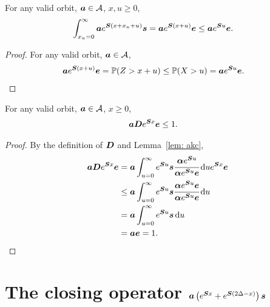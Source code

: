 \begin{lem}\label{lem: akc}
For any valid orbit, \(\boldsymbol a\in\mathcal A\), \(x,u\geq 0\), 
        \begin{align*}
        		\int_{x_n=0}^\infty \boldsymbol a e^{\boldsymbol{S}(x+x_n+u)}\boldsymbol s = \boldsymbol a e^{\boldsymbol{S}(x+u)}\boldsymbol e &\leq \boldsymbol a e^{\boldsymbol{S}u}\boldsymbol e. 
	\end{align*}
\end{lem}
\begin{proof}
	For any valid orbit, \(\boldsymbol a\in\mathcal A\), 
        \begin{align*}
        		\boldsymbol a e^{\boldsymbol{S}(x+u)}\boldsymbol e &= \mathbb P(Z>x+u) \leq\mathbb P(X>u) = \boldsymbol a e^{\boldsymbol Su} \boldsymbol e. 
	\end{align*}
\end{proof}
\begin{lem}\label{lem:macmnm}
	For any valid orbit, \(\boldsymbol a\in\mathcal A\), \(x\geq 0\), 
        \begin{align*}
        		\boldsymbol a\boldsymbol D e^{\boldsymbol{S}x}\boldsymbol e &\leq 1. 
	\end{align*}
\end{lem}
\begin{proof}
By the definition of \(\boldsymbol D\) and Lemma~\ref{lem: akc},
	\begin{align*}
        		\boldsymbol a\boldsymbol D e^{\boldsymbol{S}x}\boldsymbol e &= \boldsymbol a \int_{u=0}^\infty e^{\boldsymbol Su}\boldsymbol s\cfrac{\boldsymbol \alpha e^{\boldsymbol Su}}{\boldsymbol \alpha e^{\boldsymbol Su}\boldsymbol e}\, \mathrm{d} ue^{\boldsymbol{S}x}\boldsymbol e
		\\& \leq \boldsymbol a \int_{u=0}^\infty e^{\boldsymbol Su}\boldsymbol s\cfrac{\boldsymbol \alpha e^{\boldsymbol Su}\boldsymbol e}{\boldsymbol \alpha e^{\boldsymbol Su}\boldsymbol e}\, \mathrm{d} u
		\\& = \boldsymbol a \int_{u=0}^\infty e^{\boldsymbol Su}\boldsymbol s\, \mathrm{d} u
		\\& = \boldsymbol a \boldsymbol e = 1.
	\end{align*}
\end{proof}

\section{The closing operator \(\boldsymbol a  \left(e^{\boldsymbol{S} x}  + e^{\boldsymbol{S} (2\Delta-x)}  \right)\boldsymbol s\)}


